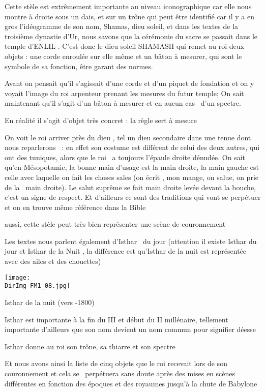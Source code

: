 \documentclass[a4paper]{article}
\newcommand{\DirImg}{../img/FaivreMartin/}
\begin{document}
Cette stèle est extrêmement importante au niveau iconographique car elle nous montre à droite sous un dais, et sur un
trône qui peut être identifié car il y a en gros l'idéogramme de son nom, Shamas, dieu soleil, et dans les textes de la
troisième dynastie d'Ur, nous savons que la cérémonie du sacre se passait dans le temple d'ENLIL . C'est donc le dieu
soleil SHAMASH qui remet au roi deux objets : une corde enroulée sur elle même et un bâton à mesurer, qui sont le
symbole de sa fonction, être garant des normes.

Avant on pensait qu'il s'agissait d'une corde et d'un piquet de fondation et on y voyait l'image du roi arpenteur
prenant les mesures du futur temple; On sait maintenant qu'il s'agit d'un bâton à mesurer et en aucun cas \ d'un
spectre.

En réalité il s'agit d'objet très concret : la règle sert à mesure

On voit le roi arriver près du dieu , tel un dieu secondaire dans une tenue dont nous reparlerons \ : en effet son
costume est différent de celui des deux autres, qui ont des tuniques, alors que le roi \ a toujours l'épaule droite
dénudée. On sait qu'en Mésopotamie, la bonne main d'usage est la main droite, la main gauche est celle avec laquelle on
fait les choses sales (on écrit , mon mange, on salue, on prie de la \ main droite). Le salut suprême se fait main
droite levée devant la bouche, c'est un signe de respect. Et d'ailleurs ce sont des traditions qui vont se perpétuer et
on en trouve même référence dans la Bible

aussi, cette stèle peut très bien représenter une scène de couronnement


Les textes nous parlent également d'Isthar \ du jour (attention il existe Isthar du jour et Isthar de la Nuit , la
différence est qu'Isthar de la nuit est représentée avec des ailes et des chouettes)


\texttt{[image: \\DirImg FM1\_08.jpg]} 


Isthar de la nuit (vers -1800)


Isthar est importante à la fin du III et début du II millénaire, tellement importante d'ailleurs que son nom devient un
nom commun pour signifier déesse

Isthar donne au roi son trône, sa thiarre et son spectre


Et nous avons ainsi la liste de cinq objets que le roi recevait lors de son couronnement et cela se \ perpétuera sans
doute après des mises en scènes différentes en fonction des époques et des royaumes jusqu'à la chute de Babylone
\end{document}
